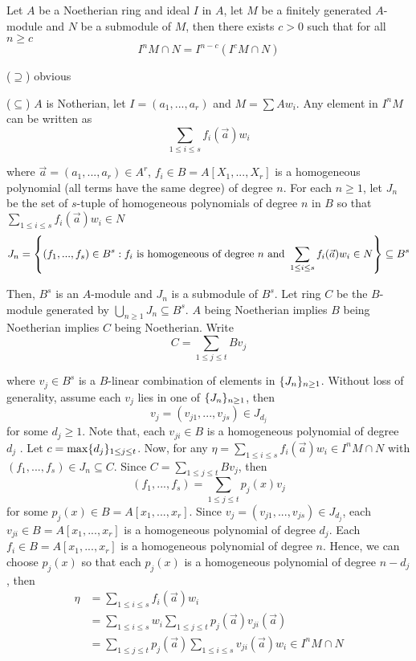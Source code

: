 \begin{theorem}
	Let $A$ be a Noetherian ring and ideal $I$ in $A$, let $M$ be a finitely generated $A$-module and $N$ be a submodule of $M$, then there exists $c > 0$ such that for all $n \geq c$
	$$
		I^n M \cap N = I^{n-c} (I^c M \cap N)
	$$
\end{theorem}

\begin{longproof}
	($\supseteq$) obvious
	
	($\subseteq$) $A$ is Notherian, let $I = (a_1, ..., a_r)$ and $M = \sum A w_i$. Any element in $I^n M$ can be written as
	$$
		\sum_{1 \leq i \leq s} f_i(\vec{a}) w_i
	$$
	
	where $\vec{a} = (a_1, ..., a_r) \in A^r$, $f_i \in B = A[X_1, ..., X_r]$ is a homogeneous polynomial (all terms have the same degree) of degree $n$. For each $n \geq 1$, let $J_n$ be the set of $s$-tuple of homogeneous polynomials of degree $n$ in $B$ so that $\sum_{1 \leq i \leq s} f_i(\vec{a}) w_i \in N$
	$$
		J_n = \set*{(f_1, ..., f_s) \in B^s: f_i \text{ is homogeneous of degree $n$ and } \sum_{1 \leq i \leq s} f_i(\vec{a}) w_i \in N} \subseteq B^s
	$$
	
	Then, $B^s$ is an $A$-module and  $J_n$ is a submodule of $B^s$. Let ring $C$ be the $B$-module generated by $\bigcup_{n \geq 1} J_n \subseteq B^s$. $A$ being Noetherian implies $B$ being Noetherian implies $C$ being Noetherian. Write
	$$
		C = \sum_{1 \leq j \leq t} B v_j
	$$
	
	where $v_j \in B^s$ is a $B$-linear combination of elements in $\set{J_n}_{n \geq 1}$. Without loss of generality, assume each $v_j$ lies in one of $\set{J_n}_{n \geq 1}$, then
	$$
		v_j = (v_{j 1}, ..., v_{j s}) \in J_{d_j}
	$$
	for some $d_j \geq 1$. Note that, each $v_{ji} \in B$ is a homogeneous polynomial of degree $d_j$ . Let $c = \max \set{d_j}_{1 \leq j \leq t}$. Now, for any $\eta = \sum_{1 \leq i \leq s} f_i(\vec{a}) w_i \in I^n M \cap N$ with $(f_1, ..., f_s) \in J_n \subseteq C$. Since  $C = \sum_{1 \leq j \leq t} B v_j$, then
	$$
		(f_1, ..., f_s) = \sum_{1 \leq j \leq t} p_j(x) v_j
	$$
	for some $p_j(x) \in B = A[x_1, ..., x_r]$. Since $v_j = (v_{j 1}, ..., v_{j s}) \in J_{d_j}$, each $v_{j i} \in B = A[x_1, ..., x_r]$ is a homogeneous polynomial of degree $d_j$. Each $f_i \in B = A[x_1, ..., x_r]$ is a homogeneous polynomial of degree $n$. Hence, we can choose $p_j(x)$ so that each $p_j(x)$ is a homogeneous polynomial of degree $n - d_j$, then
	\begin{align*}
		\eta
		&= \sum_{1 \leq i \leq s} f_i(\vec{a}) w_i \\
		&= \sum_{1 \leq i \leq s} w_i \sum_{1 \leq j \leq t} p_j(\vec{a}) v_{ji}(\vec{a}) \\
		&= \sum_{1 \leq j \leq t} p_j(\vec{a}) \sum_{1 \leq i \leq s} v_{ji}(\vec{a}) w_i \in I^n M \cap N
	\end{align*}
	

\end{longproof}
